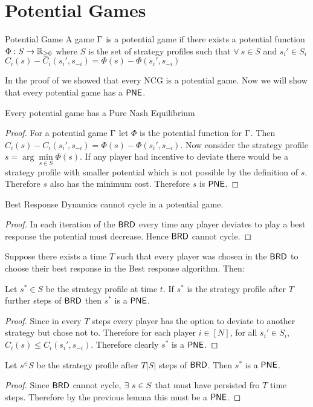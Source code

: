 \section{Potential Games}
\begin{definition}{Potential Game}{}
	A game $\Gamma$ is a potential game if there exists a potential function $\Phi:S\to\mathbb{R}_{\geq 0}$ where $S$ is the set of strategy profiles such that $\forall\ s\in S$ and $s_i'\in S_i$ $C_i(s)-C_i(s_i',s_{-i})=\Phi(s)-\Phi(s_i',s_{-i})$
\end{definition}
 
 In the proof of  we showed that every NCG is a potential game. Now we will show that every potential game has a $\operatorname{\mathsf{PNE}}$.
 \begin{Theorem}{}{}
 	Every potential game has a Pure Nash Equilibrium
 \end{Theorem}
\begin{proof}
	For a potential game $\Gamma$ let $\Phi$ is the potential function for $\Gamma$. Then $C_i(s)-C_i(s_i',s_{-i})=\Phi(s)-\Phi(s_i',s_{-i})$. Now consider the strategy profile $s=\arg\min\limits_{s\in S}\Phi(s)$. If any player had incentive to deviate there would be a strategy profile with smaller potential which is not possible by the definition of $s$. Therefore $s$ also has the minimum cost. Therefore $s$ is $\operatorname{\mathsf{PNE}}$. 
\end{proof}

\begin{lemma}{}{}
	Best Response Dynamics cannot cycle in a potential game.
\end{lemma}
\begin{proof}
	In each iteration of the $\operatorname{\mathsf{BRD}}$ every time any player deviates to play a best response the potential must decrease. Hence $\operatorname{\mathsf{BRD}}$ cannot cycle.
\end{proof}

Suppose there exists a time $T$ such that every player was chosen in the $\operatorname{\mathsf{BRD}}$ to choose their best response in the Best response algorithm. Then:
\begin{lemma}{}{}
	Let $s^*\in S$ be the strategy profile at time $t$. If $s^*$ is the strategy profile after $T$ further steps of $\operatorname{\mathsf{BRD}}$ then $s^*$ is a $\operatorname{\mathsf{PNE}}$.
\end{lemma}
\begin{proof}
	Since in every $T$ steps every player has the option to deviate to another strategy but chose not to. Therefore for each player $i\in[N]$, for all $s_i'\in S_i$, $C_i(s)\leq C_i(s_i',s_{-i})$. Therefore clearly $s^*$ is a $\operatorname{\mathsf{PNE}}$. 
\end{proof}
\begin{lemma}{}{}
	Let $s^\in S$ be the strategy profile after $T|S|$ steps of $\operatorname{\mathsf{BRD}}$. Then $s^*$ is a $\operatorname{\mathsf{PNE}}$.
\end{lemma}
\begin{proof}
	Since $\operatorname{\mathsf{BRD}}$ cannot cycle, $\exists\ s\in S$ that must have persisted fro $T$ time steps. Therefore by the previous lemma this must be a $\operatorname{\mathsf{PNE}}$.
\end{proof}


